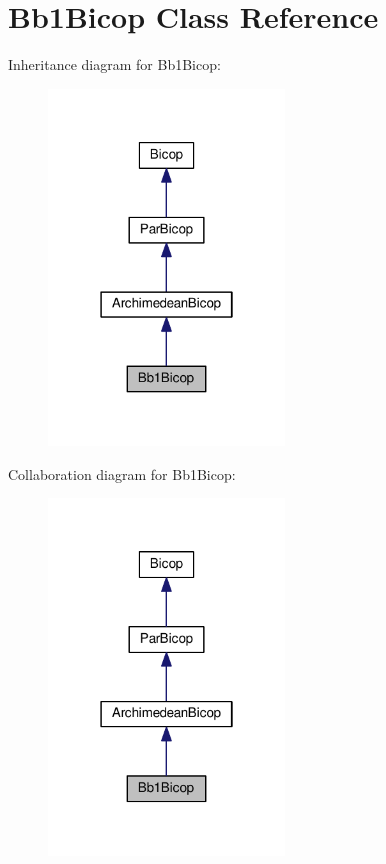 \hypertarget{class_bb1_bicop}{}\section{Bb1\+Bicop Class Reference}
\label{class_bb1_bicop}


Inheritance diagram for Bb1\+Bicop\+:\nopagebreak
\begin{figure}[H]
\begin{center}
\leavevmode
\includegraphics[width=178pt]{class_bb1_bicop__inherit__graph}
\end{center}
\end{figure}


Collaboration diagram for Bb1\+Bicop\+:\nopagebreak
\begin{figure}[H]
\begin{center}
\leavevmode
\includegraphics[width=178pt]{class_bb1_bicop__coll__graph}
\end{center}
\end{figure}
